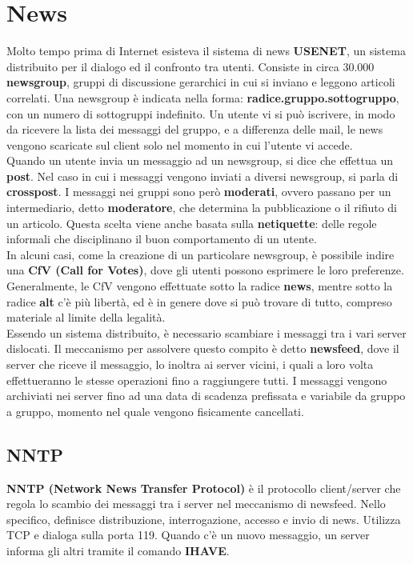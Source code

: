 \section{News}

    Molto tempo prima di Internet esisteva il sistema di news \textbf{USENET}, un sistema distribuito per
    il dialogo ed il confronto tra utenti. Consiste in circa 30.000 \textbf{newsgroup}, gruppi di discussione
    gerarchici in cui si inviano e leggono articoli correlati. Una newsgroup è indicata nella forma:
    \textbf{radice.gruppo.sottogruppo}, con un numero di sottogruppi indefinito. Un utente vi si può
    iscrivere, in modo da ricevere la lista dei messaggi del gruppo, e a differenza delle mail, le news
    vengono scaricate sul client solo nel momento in cui l’utente vi accede.\\

    Quando un utente invia un messaggio ad un newsgroup, si dice che effettua un \textbf{post}. Nel caso
    in cui i messaggi vengono inviati a diversi newsgroup, si parla di \textbf{crosspost}. I messaggi nei
    gruppi sono però \textbf{moderati}, ovvero passano per un intermediario, detto \textbf{moderatore}, che
    determina la pubblicazione o il rifiuto di un articolo. Questa scelta viene anche basata sulla
    \textbf{netiquette}: delle regole informali che disciplinano il buon comportamento di un utente.\\

    In alcuni casi, come la creazione di un particolare newsgroup, è possibile indire una \textbf{CfV (Call
    for Votes)}, dove gli utenti possono esprimere le loro preferenze. Generalmente, le CfV vengono
    effettuate sotto la radice \textbf{news}, mentre sotto la radice \textbf{alt} c’è più libertà, ed è in genere dove si
    può trovare di tutto, compreso materiale al limite della legalità.\\

    Essendo un sistema distribuito, è necessario scambiare i messaggi tra i vari server dislocati. Il
    meccanismo per assolvere questo compito è detto \textbf{newsfeed}, dove il server che riceve il
    messaggio, lo inoltra ai server vicini, i quali a loro volta effettueranno le stesse operazioni fino
    a raggiungere tutti. I messaggi vengono archiviati nei server fino ad una data di scadenza
    prefissata e variabile da gruppo a gruppo, momento nel quale vengono fisicamente cancellati.

    \subsection{NNTP}

        \textbf{NNTP (Network News Transfer Protocol)} è il protocollo client/server che regola lo scambio
        dei messaggi tra i server nel meccanismo di newsfeed. Nello specifico, definisce distribuzione,
        interrogazione, accesso e invio di news. Utilizza TCP e dialoga sulla porta 119.
        Quando c’è un nuovo messaggio, un server informa gli altri tramite il comando \textbf{IHAVE}.